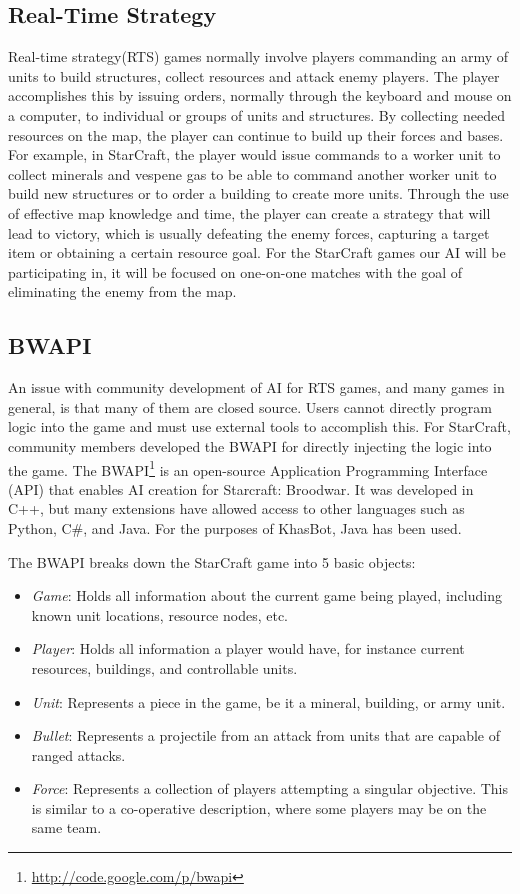 \documentclass[letterpaper]{article}
\begin{document}
\subsection{Real-Time Strategy} %
Real-time strategy(RTS) games normally involve players commanding an army of units to build structures, collect resources and attack enemy players.
The player accomplishes this by issuing orders, normally through the keyboard and mouse on a computer, to individual or groups of units and structures.  By collecting needed resources on the map, the player can continue to build up their forces and bases.  For example, in StarCraft, the player would issue commands to a worker unit to collect minerals and vespene gas to be able to command another worker unit to build new structures or to order a building to create more units.  Through the use of effective map knowledge and time, the player can create a strategy that will lead to victory, which is usually defeating the enemy forces, capturing a target item or obtaining a certain resource goal.  For the StarCraft games our AI will be participating in, it will be focused on one-on-one matches with the goal of eliminating the enemy from the map.


\subsection{BWAPI}
An issue with community development of AI for RTS games, and many games in general, is that many of them are closed source.  Users cannot directly program logic into the game and must use external tools to accomplish this.  For StarCraft, community members developed the BWAPI for directly injecting the logic into the game.  The BWAPI\footnote{\url{http://code.google.com/p/bwapi}} is an open-source Application Programming Interface (API) that enables AI creation for Starcraft: Broodwar.  It was developed in C++, but many extensions have allowed access to other languages such as Python, C\#, and Java.  For the purposes of KhasBot, Java has been used.

The BWAPI breaks down the StarCraft game into 5 basic objects: 
\begin{itemize}
\item \emph{Game}:  Holds all information about the current game being played, including known unit locations, resource nodes, etc. 
\item \emph{Player}:  Holds all information a player would have, for instance current resources, buildings, and controllable units.
\item \emph{Unit}: Represents a piece in the game, be it a mineral, building, or army unit.
\item \emph{Bullet}: Represents a projectile from an attack from units that are capable of ranged attacks.
\item \emph{Force}: Represents a collection of players attempting a singular objective.  This is similar to a co-operative description, where some players may be on the same team.
\end{itemize}
\end{document}
